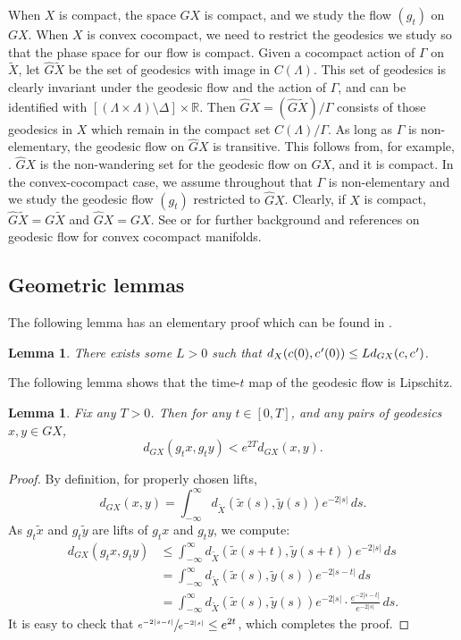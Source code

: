 \documentclass[11pt]{article}
\newcommand{\cpr}{c\mkern1mu'}
\newtheorem{lem}[thm]{Lemma}
\theoremstyle{definition}
\numberwithin{equation}{section}
\begin{document}
When $X$ is compact, the space $GX$ is compact, and we study the flow $(g_t)$ on $GX$. When $X$ is convex cocompact, we need to restrict the geodesics we study so that the phase space for our flow is compact. Given a cocompact action of $\Gamma$ on $\tilde X$, let $\hat G\tilde X$ be the set of geodesics with image in $C(\Lambda)$. This set of geodesics is clearly invariant under the geodesic flow and the action of $\Gamma$, and can be identified with $[(\Lambda \times \Lambda)\setminus \Delta]\times \mathbb{R}$. Then $\hat G X = (\hat G\tilde X)/\Gamma$ consists of those geodesics in $X$ which remain in the compact set $C(\Lambda)/\Gamma$. As long as $\Gamma$ is non-elementary, the geodesic flow on $\hat GX$ is transitive. This follows from, for example, \cite[\S8.2]{gromov}. $\hat GX$ is the non-wandering set for the geodesic flow on $GX$, and it is compact. In the convex-cocompact case, we assume throughout that $\Gamma$ is non-elementary and we study the geodesic flow $(g_t)$ restricted to $\hat G X$. Clearly, if $X$ is compact, $\hat G\tilde X = G\tilde X$ and $\hat GX = GX$. See \cite{tapie} or \cite{mB95} for further background and references on geodesic flow for convex cocompact manifolds.

\subsection{Geometric lemmas}

The following lemma has an elementary proof which can be found in \cite[Lem.\,2.8]{CLT}.

\begin{lem}\label{lem:X GX bound}
There exists some $L>0$ such that $d_X(c(0), \cpr(0)) \leq L d_{GX}(c,\cpr)$.
\end{lem}

The following lemma shows that the time-$t$ map of the geodesic flow is Lipschitz.
\begin{lem}\label{lem:Lipschitz}
Fix any $T>0$. Then for any $t\in[0,T]$, and any pairs of geodesics $x,y\in GX$,
\[ d_{GX}(g_t x, g_t y) < e^{2T} d_{GX}(x,y). \]
\end{lem}

\begin{proof}
By definition, for properly chosen lifts,
\[ d_{GX}(x,y) = \int_{-\infty}^\infty d_{\tilde X}(\tilde x(s), \tilde y(s)) e^{-2|s|}\,ds. \]
As $g_t\tilde x$ and $g_t\tilde y$ are lifts of $g_tx$ and $g_ty$, we compute:
\begin{align*}
d_{GX}(g_tx,g_ty) & \leq \int_{-\infty}^\infty d_{\tilde X}(\tilde x(s+t),\tilde y(s+t))e^{-2|s|}\,ds \\
& = \int_{-\infty}^\infty d_{\tilde X}(\tilde x(s),\tilde y(s))e^{-2|s-t|}\,ds \\
& = \int_{-\infty}^\infty d_{\tilde X}(\tilde x(s),\tilde y(s))e^{-2|s|}\cdot \frac{e^{-2|s-t|}}{e^{-2|s|}}\,ds.  
\end{align*}
It is easy to check that $\sfrac{e^{-2|s-t|}}{e^{-2|s|}} \leq e^{2t}$, which completes the proof.
\end{proof}
\end{document}
